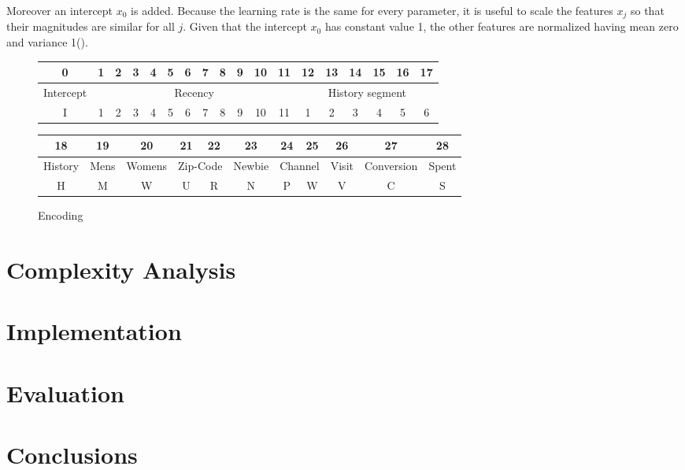 \documentclass[10pt,twocolumn,letterpaper]{article}
\begin{document}
Moreover an intercept $x_0$ is added.
Because the learning rate is the same for every parameter, it is useful to scale the features $x_j$ so that their magnitudes are similar for all $j$. Given that the intercept $x_0$ has constant value 1, the other features are normalized having mean zero and variance 1(\cite{elkan11}).

\begin{figure*}[tb]
	\centering
 	\begin{tabular}{|c|c|c|c|c|c|c|c|c|c|c|c|c|c|c|c|c|c|}
  	\hline
  	 0&1&2&3&4&5&6&7&8&9&10&11&12&13&14&15&16&17\\ 
  	 \hline
  	 Intercept&\multicolumn{11}{|c|}{Recency}&\multicolumn{6}{|c|}{History segment}\\
  	 \hline
		I&1&2&3&4&5&6&7&8&9&10&11&1&2&3&4&5&6\\ 
  	\hline
 		\end{tabular}
 		


 		\begin{tabular}{|c|c|c|c|c|c|c|c|c|c|c|}
  	\hline
  	 18&19&20&21&22&23&24&25&26&27&28\\ 
  	 \hline
  	 History&Mens&Womens&\multicolumn{2}{|c|}{Zip-Code}&Newbie&\multicolumn{2}{|c|}{Channel}&Visit&Conversion&Spent\\
  	 \hline
		H&M&W&U&R&N&P&W&V&C&S\\ 
  	\hline
 		\end{tabular}
\caption{Encoding}
    \label{encoding}
\end{figure*}

\section{Complexity Analysis}

\section{Implementation}


\section{Evaluation}




\section{Conclusions}


\nocite{hillstrom08, bishop06,bottou11,elkan11}

{\small


}
\end{document}
